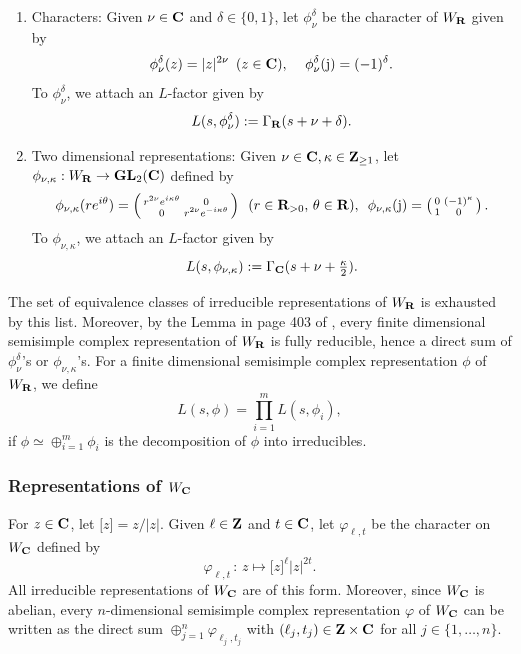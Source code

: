 \documentclass[11pt, reqno]{amsart}
\theoremstyle{plain}
\theoremstyle{definition}
\theoremstyle{remark}
\theoremstyle{plain}
\def\Z{{\bf Z}}
\def\C{{\bf C}}
\def\R{{\bf R}}
\def\GL{\mathbf{GL}}
\begin{document}
\begin{enumerate}
    \item Characters: Given $\nu \in \C$ and $\delta \in \{ 0,1\}$, let $\phi_\nu^\delta$ be the character of $W_\R$ given by $$ \phi_\nu^\delta(z) = |z|^{2\nu}\,\,\,(z \in \C), \,\,\,\,\,\,\, \phi_\nu^\delta({\rm j})=(-1)^\delta.$$
    To $\phi_\nu^\delta$, we attach an $L$-factor given by $$ L(s,\phi_\nu^\delta) := \Gamma_\R(s+ \nu + \delta).$$
    \item Two dimensional representations: Given $\nu \in \C, \kappa \in \Z_{\geq 1}$, let $\phi_{\nu,\kappa}: W_\R \to \GL_2(\C)$ defined by 
    \begin{align*}
        \phi_{\nu,\kappa}( r e^{i \theta}) = \left( \begin{smallmatrix}
            r^{2 \nu} e^{i \kappa \theta} & 0 \\ 0 & r^{2 \nu} e^{-i \kappa \theta}
        \end{smallmatrix} \right)\,\,\,(r \in \R_{>0},\,\theta \in \R),\,\,\, \phi_{\nu,\kappa}( {\rm j}) = \left( \begin{smallmatrix}
            0 & (-1)^\kappa \\ 1 & 0
        \end{smallmatrix} \right).
    \end{align*}
    To $\phi_{\nu,\kappa}$, we attach an $L$-factor given by $$ L(s,\phi_{\nu,\kappa}) := \Gamma_\C(s+ \nu + \tfrac{\kappa}{2}).$$
\end{enumerate}
The set of equivalence classes of irreducible representations of $W_\R$ is exhausted by this list. Moreover, by the Lemma in page 403 of \cite{KnappLLCA}, every finite dimensional semisimple complex representation of $W_\R$ is fully reducible, hence a direct sum of $\phi_\nu^\delta$'s or $\phi_{\nu,\kappa}$'s. For a finite dimensional semisimple complex representation $\phi$ of $W_\R$, we define $$L(s,\phi) = \prod_{i=1}^m L(s, \phi_i),$$ if $\phi \simeq \oplus_{i=1}^m \phi_i$ is the decomposition of $\phi$ into irreducibles. 

\subsubsection{Representations of $W_\C$}

For $z \in \C$, let $\boldsymbol{[} z \boldsymbol{]} = z /|z|$. Given $\ell \in \Z$ and $t \in \C$, let $\varphi_{\ell,t}$ be the character on $W_\C$ defined by $$\varphi_{\ell,t} \,:\, z \mapsto  \boldsymbol{[} z \boldsymbol{]}^\ell |z|^{2t}.$$
All irreducible representations of $W_\C$ are of this form. Moreover, since $W_\C$ is abelian, every  $n$-dimensional semisimple complex representation $\varphi$ of $W_\C$ can be written as the direct sum $\oplus_{j=1}^n\varphi_{\ell_j,t_j}$ with $(\ell_j,t_j) \in \Z \times \C$ for all $j \in \{1, \dots, n\}$.
\end{document}
